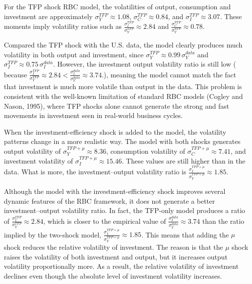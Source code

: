 \documentclass[12pt]{article}
\begin{document}
For the TFP shock RBC model, the volatilities of output, consumption and investment are approximately $\sigma_Y^{TFP} \approx 1.08$, $\sigma_C^{TFP} \approx 0.84$, and $\sigma_I^{TFP} \approx 3.07$. These moments imply volatility ratios such as $\frac{\sigma_I^{TFP}}{\sigma_Y^{TFP}} \approx 2.84$ and $\frac{\sigma_C^{TFP}}{\sigma_Y^{TFP}} \approx 0.78$. 

Compared the TFP shock with the U.S. data, the model clearly produces much volatility in both output and investment, since $\sigma_Y^{TFP} \approx 0.99\,\sigma_Y^{data}$ and $\sigma_I^{TFP} \approx 0.75\,\sigma_I^{data}$. However, the investment output volatility ratio is still low ( because $\frac{\sigma_I^{TFP}}{\sigma_Y^{TFP}} \approx 2.84 < \frac{\sigma_I^{data}}{\sigma_Y^{data}} \approx 3.74$.), meaning the model cannot match the fact that investment is much more volatile than output in the data. 
This problem is consistent with the well-known limitation of standard RBC models (Cogley and Nason, 1995), where TFP shocks alone cannot generate the strong and fast movements in investment seen in real-world business cycles.

When the investment-efficiency shock is added to the model, the volatility patterns change in a more realistic way. The model with both shocks generates output volatility of $\sigma_Y^{TFP+\mu} \approx 8.36$, consumption volatility of $\sigma_C^{TFP+\mu} \approx 7.41$, and investment volatility of $\sigma_I^{TFP+\mu} \approx 15.46$. These values are still higher than in the data. What is more, the investment–output volatility ratio is $\frac{\sigma_I^{TFP+\mu}}{\sigma_Y^{TFP+\mu}} \approx 1.85$. 

Although the model with the investment-efficiency shock improves several dynamic features of the RBC framework, it does not generate a better investment–output volatility ratio. In fact, the TFP-only model produces a ratio of $\frac{\sigma_I^{TFP}}{\sigma_Y^{TFP}} \approx 2.84$, which is closer to the empirical value of $\frac{\sigma_I^{data}}{\sigma_Y^{data}} \approx 3.74$ than the ratio implied by the two-shock model, $\frac{\sigma_I^{TFP+\mu}}{\sigma_Y^{TFP+\mu}} \approx 1.85$. This means that adding the $\mu$ shock reduces the relative volatility of investment.
The reason is that the $\mu$ shock raises the volatility of both investment and output, but it increases output volatility proportionally more. As a result, the relative volatility of investment declines even though the absolute level of investment volatility increases. 
\end{document}
